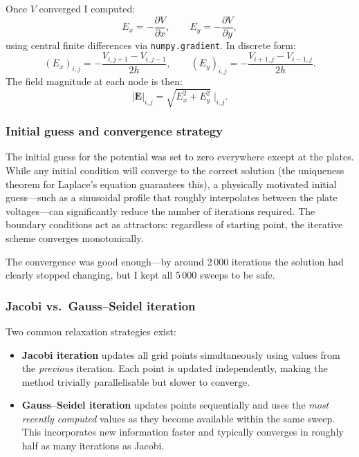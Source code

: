 \documentclass[11pt,a4paper]{article}
\begin{document}
Once $V$ converged I computed:
\begin{equation}
E_x = -\frac{\partial V}{\partial x}, \qquad E_y = -\frac{\partial V}{\partial y},
\end{equation}
using central finite differences via \texttt{numpy.gradient}. In discrete form:
\begin{equation}
(E_x)_{i,j} = -\frac{V_{i,j+1} - V_{i,j-1}}{2h}, \qquad
(E_y)_{i,j} = -\frac{V_{i+1,j} - V_{i-1,j}}{2h}.
\end{equation}
The field magnitude at each node is then:
\begin{equation}
|\mathbf{E}|_{i,j} = \sqrt{E_x^2 + E_y^2}\;\Big|_{i,j}.
\end{equation}

\subsubsection{Initial guess and convergence strategy}

The initial guess for the potential was set to zero everywhere except at the plates. While any initial condition will converge to the correct solution (the uniqueness theorem for Laplace's equation guarantees this), a physically motivated initial guess---such as a sinusoidal profile that roughly interpolates between the plate voltages---can significantly reduce the number of iterations required. The boundary conditions act as attractors: regardless of starting point, the iterative scheme converges monotonically.

The convergence was good enough---by around 2\,000 iterations the solution had clearly stopped changing, but I kept all 5\,000 sweeps to be safe.

\subsubsection{Jacobi vs.\ Gauss--Seidel iteration}

Two common relaxation strategies exist:
\begin{itemize}[leftmargin=2em]
\item \textbf{Jacobi iteration} updates all grid points simultaneously using values from the \emph{previous} iteration. Each point is updated independently, making the method trivially parallelisable but slower to converge.
\item \textbf{Gauss--Seidel iteration} updates points sequentially and uses the \emph{most recently computed} values as they become available within the same sweep. This incorporates new information faster and typically converges in roughly half as many iterations as Jacobi.
\end{itemize}
\end{document}
